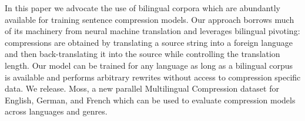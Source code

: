 In this paper we advocate the use of bilingual corpora which are abundantly available for training sentence compression models. Our approach borrows much of its machinery from neural machine translation and leverages bilingual pivoting: compressions are obtained by translating a source string into a foreign language and then back-translating it into the source while controlling the translation length. Our model can be trained for any language as long as a bilingual corpus is available and performs arbitrary rewrites without access to compression specific data.  We release. Moss, a new parallel Multilingual Compression dataset for English, German, and French which can be used to evaluate compression models across languages and genres.
